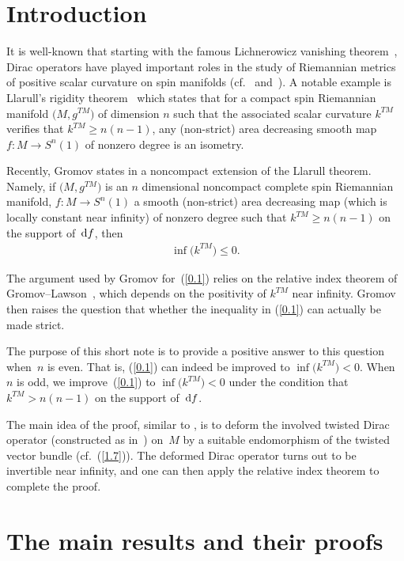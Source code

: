 \section{Introduction} \label{s0}

It is well-known that starting with the famous Lichnerowicz vanishing theorem~\cite{L63}, Dirac operators have played important roles in the study of Riemannian metrics of positive scalar curvature on spin manifolds (cf.~\cite{GL83} and~\cite{LaMi89}). A notable example is Llarull's rigidity theorem~\cite{L98} which states that for a compact spin Riemannian manifold $\big(M,g^{TM}\big)$ of dimension $n$ such that the associated scalar curvature $k^{TM}$ verifies that $k^{TM}\geq n(n-1)$, any (non-strict) area decreasing smooth map $f\colon M\rightarrow S^n(1)$ of nonzero degree is an isometry.

Recently, Gromov states in \cite[p.~45]{Gr19} a noncompact extension of the Llarull theorem. Namely, if $\big(M,g^{TM}\big)$ is an $n$ dimensional noncompact complete spin Riemannian manifold, $f\colon M\rightarrow S^n(1)$ a smooth (non-strict) area decreasing map (which is locally constant near infinity) of nonzero degree such that $k^{TM}\geq n(n-1)$ on the support of~${\rm d}f$, then
\begin{gather}\label{0.1}
\inf \big(k^{TM}\big)\leq 0.
\end{gather}

The argument used by Gromov for~(\ref{0.1}) relies on the relative index theorem of Gromov--Lawson~\cite{GL83}, which depends on the positivity of $k^{TM}$ near infinity. Gromov then raises the question that whether the inequality in (\ref{0.1}) can actually be made {strict}.

The purpose of this short note is to provide a positive answer to this question when~$n$ is even. That is, (\ref{0.1}) can indeed be improved to $\inf \big(k^{TM}\big)< 0$. When $n$ is odd, we improve~(\ref{0.1}) to $\inf \big(k^{TM}\big)< 0$ under the condition that $k^{TM}> n(n-1)$ on the support of~${\rm d}f$.

The main idea of the proof, similar to \cite[equation~(1.11)]{Z19}, is to deform the involved twisted Dirac operator (constructed as in~\cite{L98})
on~$M$ by a suitable endomorphism of the twisted vector bundle (cf.~(\ref{1.7})). The deformed Dirac operator turns out to be invertible near infinity, and one can then apply the relative index theorem to complete the proof.

\section{The main results and their proofs}\label{s1}
